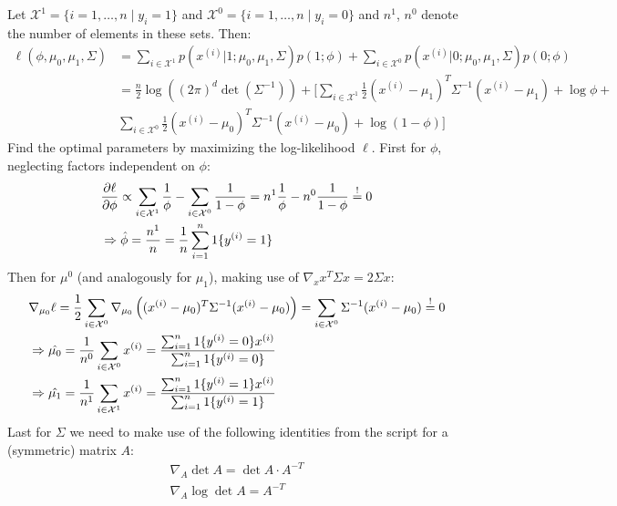 \begin{answer}
Let \(\mathcal{X}^1 = \{i=1,\ldots,n \mid y_i = 1\} \) and \(\mathcal{X}^0 = \{i=1,\ldots,n \mid y_i = 0\} \) and $n^1$, $n^0$ denote the number of elements in these sets.
Then:
\begin{align*}
\ell(\phi, \mu_{0}, \mu_1, \Sigma) &= \sum_{i\in\mathcal{X}^1} p(x^{(i)} | 1; \mu_{0}, \mu_1, \Sigma) p(1;\phi) + \sum_{i\in\mathcal{X}^0} p(x^{(i)} | 0; \mu_{0}, \mu_1, \Sigma) p(0;\phi)    \\
&= \frac{n}{2}\log\left((2\pi)^{d}\det\left({\Sigma^{-1}}\right)\right) + \biggl[ \sum_{i\in\mathcal{X}^1} \frac{1}{2}(x^{(i)}-\mu_{1})^T \Sigma^{-1} (x^{(i)}-\mu_{1}) + \log\phi + \\
& \sum_{i\in\mathcal{X}^0} \frac{1}{2}(x^{(i)}-\mu_{0})^T \Sigma^{-1} (x^{(i)}-\mu_{0}) + \log\left(1-\phi\right)   \biggr]
\end{align*}
Find the optimal parameters by maximizing the log-likelihood $\ell$.
First for $\phi$, neglecting factors independent on $\phi$:
\begin{align*}
    &\frac{\partial\ell}{\partial\phi} \propto \sum_{i\in\mathcal{X}^1}\frac{1}{\phi} - \sum_{i\in\mathcal{X}^0}\frac{1}{1-\phi} = n^1 \frac{1}{\phi} - n^0 \frac{1}{1-\phi} \overset{!}{=} 0 \\
    &\Rightarrow \hat{\phi} = \frac{n^1}{n} = \frac{1}{{n}} \sum_{i=1}^{n} 1\{y^{(i)} = 1\}
\end{align*}
Then for $\mu^0$ (and analogously for $\mu_1$), making use of $\nabla_x x^T\Sigma x = 2\Sigma x$:
\begin{align*}
    &\nabla_{\mu_0}\ell = \frac{1}{2}\sum_{i\in\mathcal{X}^0} \nabla_{\mu_0}\left((x^{(i)}-\mu_{0})^T \Sigma^{-1} (x^{(i)}-\mu_{0})\right) = \sum_{i\in\mathcal{X}^0} \Sigma^{-1}(x^{(i)}-\mu_0) \overset{!}{=} 0 \\
    &\Rightarrow \hat{\mu_0} = \frac{1}{n^0} \sum_{i\in\mathcal{X}^0} x^{(i)} = \frac{\sum_{i=1}^{n} 1\{y^{(i)} = {0}\} x^{(i)}}{\sum_{i=1}^{n}
    1\{y^{(i)} = {0}\}} \\
    &\Rightarrow \hat{\mu_1} = \frac{1}{n^1} \sum_{i\in\mathcal{X}^1} x^{(i)} = \frac{\sum_{i=1}^{n} 1\{y^{(i)} = {1}\} x^{(i)}}{\sum_{i=1}^{n}
    1\{y^{(i)} = {1}\}}
\end{align*}
Last for $\Sigma$ we need to make use of the following identities from the script for a (symmetric) matrix $A$:
\begin{align*}
    \nabla_A \det A = \det A\cdot A^{-T} \\
    \nabla_A \log \det A = A^{-T} \\

\end{align*}
\end{answer}
